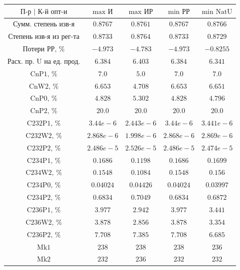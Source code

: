 \begin{table}
    \begin{tabular}{ccccc}
        $\text{П-р | К-й опт-и}$ & $\text{max И}$ & $\text{max ИР}$ & $\text{min РР}$ & $\text{min NatU}$\\ \hline
        $\text{Сумм. степень изв-я}$ & $0.8767$ & $0.8761$ & $0.8767$ & $0.8766$\\ \hline
        $\text{Степень изв-я из рег-та}$ & $0.8733$ & $0.8764$ & $0.8733$ & $0.8729$\\ \hline
        $\text{Потери РР, \%}$ & $-4.973$ & $-4.783$ & $-4.973$ & $-0.8255$\\ \hline
        $\text{Расх. пр. U на ед. прод.}$ & $6.384$ & $6.403$ & $6.384$ & $6.341$\\ \hline
        $\text{CnP1, \%}$ & $7.0$ & $5.0$ & $7.0$ & $7.0$\\ \hline
        $\text{CnW2, \%}$ & $6.653$ & $4.708$ & $6.653$ & $6.651$\\ \hline
        $\text{CnP0, \%}$ & $4.828$ & $5.302$ & $4.828$ & $4.796$\\ \hline
        $\text{CnP2, \%}$ & $20.0$ & $20.0$ & $20.0$ & $20.0$\\ \hline
        $\text{C232P1, \%}$ & $3.44e-6$ & $2.443e-6$ & $3.44e-6$ & $3.441e-6$\\ \hline
        $\text{C232W2, \%}$ & $2.868e-6$ & $1.998e-6$ & $2.868e-6$ & $2.869e-6$\\ \hline
        $\text{C232P2, \%}$ & $2.486e-5$ & $2.526e-5$ & $2.486e-5$ & $2.474e-5$\\ \hline
        $\text{C234P1, \%}$ & $0.1686$ & $0.1198$ & $0.1686$ & $0.1699$\\ \hline
        $\text{C234W2, \%}$ & $0.1548$ & $0.1084$ & $0.1548$ & $0.156$\\ \hline
        $\text{C234P0, \%}$ & $0.04024$ & $0.04426$ & $0.04024$ & $0.03997$\\ \hline
        $\text{C234P2, \%}$ & $0.6834$ & $0.7049$ & $0.6834$ & $0.6872$\\ \hline
        $\text{C236P1, \%}$ & $3.977$ & $2.942$ & $3.977$ & $3.441$\\ \hline
        $\text{C236W2, \%}$ & $3.878$ & $2.856$ & $3.878$ & $3.354$\\ \hline
        $\text{C236P2, \%}$ & $7.708$ & $7.385$ & $7.708$ & $6.685$\\ \hline
        $\text{Mk1}$ & $238$ & $238$ & $238$ & $236$\\ \hline
        $\text{Mk2}$ & $232$ & $236$ & $232$ & $232$\\ \hline

\end{tabular}
\end{table}
